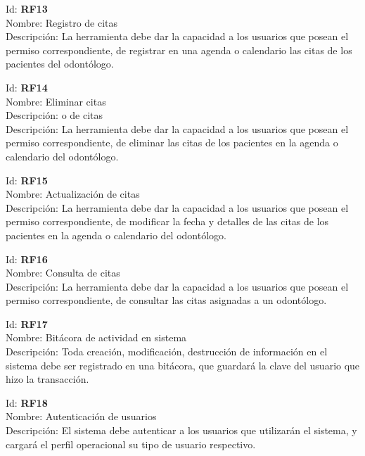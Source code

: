 \vspace{1em}

\noindent Id:  \textbf{RF13}\\
Nombre: Registro de citas\\
Descripción: La herramienta debe dar la capacidad a los usuarios que posean el permiso correspondiente, de registrar en una agenda o calendario las citas de los pacientes del odontólogo.

\vspace{1em}

\noindent Id:  \textbf{RF14}\\
Nombre: Eliminar citas\\
Descripción: o de citas\\
Descripción: La herramienta debe dar la capacidad a los usuarios que posean el permiso correspondiente, de eliminar las citas de los pacientes en la agenda o calendario del odontólogo.

\vspace{1em}

\noindent Id:  \textbf{RF15}\\
Nombre: Actualización de citas\\
Descripción: La herramienta debe dar la capacidad a los usuarios que posean el permiso correspondiente, de modificar la fecha y detalles de las citas de los pacientes en la agenda o calendario del odontólogo.


\noindent Id:  \textbf{RF16}\\
Nombre: Consulta de citas\\
Descripción: La herramienta debe dar la capacidad a los usuarios que posean el permiso correspondiente, de consultar las citas asignadas a un odontólogo.

\vspace{1em}

\noindent Id: \textbf{RF17}\\
Nombre: Bitácora de actividad en sistema\\
Descripción: Toda creación, modificación, destrucción de información en el sistema debe ser registrado en una bitácora, que guardará la clave del usuario que hizo la transacción.

\vspace{1em}

\noindent Id: \textbf{RF18}\\
Nombre: Autenticación de usuarios\\
Descripción: El sistema debe autenticar a los usuarios que utilizarán el sistema, y cargará el perfil operacional su tipo de usuario respectivo.


